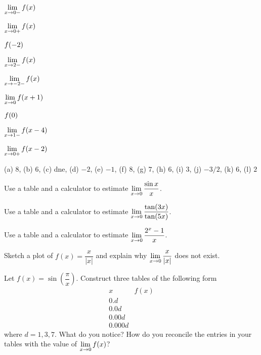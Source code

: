\begin{exercises}
\begin{exercise}
\begin{enumerate}
\begin{multicols}{3}
\item $\displaystyle \lim_{x\to 0-} f(x)$  
\item $\displaystyle \lim_{x\to 0+} f(x)$  
\item $\displaystyle f(-2)$  
\item $\displaystyle \lim_{x\to 2-} f(x)$  
\item $\displaystyle \lim_{x\to -2-} f(x)$  
\item $\displaystyle \lim_{x\to 0} f(x+1)$  
\item $\displaystyle f(0)$ 
\item $\displaystyle \lim_{x\to 1-} f(x-4)$  
\item $\displaystyle \lim_{x\to 0+} f(x-2)$
\end{multicols}  
\end{enumerate}
\begin{answer} (a) $8$, (b) $6$, (c) dne, (d) $-2$, (e) $-1$, (f) $8$,
 (g) $7$, (h) $6$, (i) $3$, (j) $-3/2$, (k) $6$, (l) $2$
\end{answer}
\end{exercise}


\begin{exercise} 
Use a table and a calculator to estimate $\displaystyle\lim_{x\to 0} {\sin
  x\over x}$.
\end{exercise}

\begin{exercise} 
Use a table and a calculator to estimate $\displaystyle\lim_{x\to
  0}\frac{\tan(3x)}{\tan(5x)}$.
\end{exercise}

\begin{exercise} 
Use a table and a calculator to estimate $\displaystyle\lim_{x\to 0}
\frac{2^x-1}{x}$.
\end{exercise}


\begin{exercise} 
Sketch a plot of $f(x) = \dfrac{x}{|x|}$ and explain why $\displaystyle
\lim_{x\to 0} \frac{x}{|x|}$ does not exist.
\end{exercise}



\begin{exercise} 
Let $f(x) = \sin\left(\dfrac{\pi}{x}\right)$. Construct three tables
of the following form
\[
\begin{array}{c|c}
 x & f(x) \\ \hline
 0.d &   \\
 0.0d &  \\
 0.00d &   \\
 0.000d &  
\end{array}
\]
where $d = 1,3,7$. What do you notice? How do you reconcile the
entries in your tables with the value of $\displaystyle\lim_{x\to 0} f(x)$?
\end{exercise}
\end{exercises}















